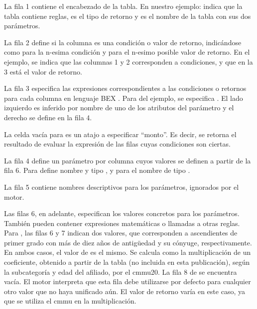 La fila 1 contiene el encabezado de la tabla.
En nuestro ejemplo:  indica que la tabla contiene reglas,
 es el tipo de retorno y  es el nombre de la tabla con sus dos parámetros.

La fila 2 define si la columna es una condición o valor de retorno, indicándose como   para la n-esima condición y  para el n-esimo posible valor de retorno.
En el ejemplo, se indica que las columnas 1 y 2 corresponden a condiciones, y que en la 3 está el valor de retorno.

La fila 3 especifica las expresiones correspondientes a las condiciones o retornos para cada columna en lenguaje BEX \cite{openl}.
Para  del ejemplo, se especifica .
El lado izquierdo es inferido por nombre de uno de los atributos del parámetro  y el derecho se define en la fila 4.

La celda vacía para  es un atajo a especificar ``monto''.
Es decir, se retorna el resultado de evaluar la expresión de las filas cuyas condiciones son ciertas.

La fila 4 define un parámetro por columna cuyos valores se definen a partir de la fila 6.
Para  define nombre  y tipo , y para  el nombre  de tipo .

La fila 5 contiene nombres descriptivos para los parámetros, ignorados por el motor.

Las filas 6, en adelante, especifican los valores concretos para los parámetros.
También pueden contener expresiones matemáticas o llamadas a otras reglas.
%
Para , las filas 6 y 7 indican dos valores, que corresponden a ascendientes de primer grado con más de diez años de antigüedad y su cónyuge, respectivamente.
En ambos casos, el valor de  es el mismo.
Se calcula como la multiplicación de un coeficiente, obtenido a partir de la tabla  (no incluida en esta publicación), según la subcategoría y edad del afiliado, por el \acrshort{cmmu20}.
%
La fila 8 de  se encuentra vacía.
El motor interpreta que esta fila debe utilizarse por defecto para cualquier otro valor que no haya unificado aún.
El valor de retorno varía en este caso, ya que se utiliza el \acrshort{cmmu} en la multiplicación.

